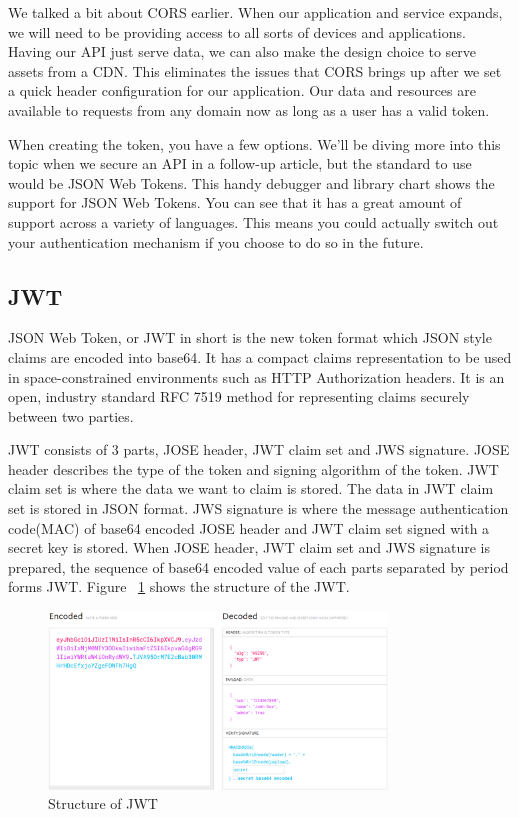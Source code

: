 \documentclass[journal,article,submit,moreauthors,pdftex,10pt,a4paper]{mdpi}
\begin{document}
We talked a bit about CORS earlier. When our application and service expands, we will need to be providing access to all sorts of devices and applications. Having our API just serve data, we can also make the design choice to serve assets from a CDN. This eliminates the issues that CORS brings up after we set a quick header configuration for our application. Our data and resources are available to requests from any domain now as long as a user has a valid token.

When creating the token, you have a few options. We’ll be diving more into this topic when we secure an API in a follow-up article, but the standard to use would be JSON Web Tokens. This handy debugger and library chart shows the support for JSON Web Tokens. You can see that it has a great amount of support across a variety of languages. This means you could actually switch out your authentication mechanism if you choose to do so in the future.

\subsection{JWT}
JSON Web Token, or JWT in short is the new token format which JSON style claims are encoded into base64. It has a compact claims representation to be used in space-constrained environments such as HTTP Authorization headers. It is an open, industry standard RFC 7519 method for representing claims securely between two parties.

JWT consists of 3 parts, JOSE header, JWT claim set and JWS signature. JOSE header describes the type of the token and signing algorithm of the token. JWT claim set is where the data we want to claim is stored. The data in JWT claim set is stored in JSON format. JWS signature is where the message authentication code(MAC) of base64 encoded JOSE header and JWT claim set signed with a secret key is stored. When JOSE header, JWT claim set and JWS signature is prepared, the sequence of base64 encoded value of each parts separated by period forms JWT. Figure ~\ref{structure} shows the structure of the JWT.

\begin{figure}[H]
    \centering
    \includegraphics[width=9cm]{figures/jwt_structure}
    \caption{Structure of JWT}
    \label{structure}
\end{figure}
\end{document}
